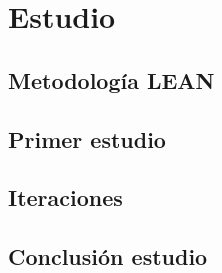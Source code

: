 
\chapter{Estudio}\label{estudio}
\section{Metodología LEAN}\label{sec:metodologia_lean}

\section{Primer estudio}\label{sec:primer_estudio}

\section{Iteraciones}\label{sec:iteraciones}

\section{Conclusión estudio}\label{sec:conclusiones_estudio}